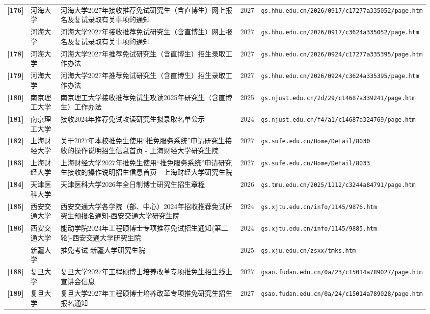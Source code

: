 {\begin{longtable}{@{}p{1.15cm}p{2.9cm}p{6.3cm}p{0.85cm}p{5.0cm}@{}}
\textbf{[176]} & 河海大学 & 河海大学2027年接收推荐免试研究生（含直博生）网上报名及复试录取有关事项的通知 & 2027 & \texttt{gs.hhu.edu.cn/2026/0917/c17277a335052/page.htm} \\
[177] & 河海大学 & 河海大学2027年接收推荐免试研究生（含直博生）网上报名及复试录取有关事项的通知 & 2027 & \texttt{gs.hhu.edu.cn/2026/0917/c3624a335052/page.htm} \\
\textbf{[178]} & 河海大学 & 河海大学2027年推荐免试研究生（含直博生）招生录取工作办法 & 2027 & \texttt{gs.hhu.edu.cn/2026/0924/c17277a335395/page.htm} \\
\textbf{[179]} & 河海大学 & 河海大学2027年推荐免试研究生（含直博生）招生录取工作办法 & 2027 & \texttt{gs.hhu.edu.cn/2026/0924/c3624a335395/page.htm} \\
\textbf{[180]} & 南京理工大学 & 南京理工大学接收推荐免试生攻读2025年研究生（含直博生）工作办法 & 2025 & \texttt{gs.njust.edu.cn/2d/29/c14687a339241/page.htm} \\
\textbf{[181]} & 南京理工大学 & 接收2024年推荐免试攻读研究生拟录取名单公示 & 2024 & \texttt{gs.njust.edu.cn/f4/a1/c14687a324769/page.htm} \\
\textbf{[182]} & 上海财经大学 & 关于2027年本校推免生使用“推免服务系统”申请研究生接收的操作说明\textbar{}招生信息\textbar{}首页 - 上海财经大学研究生院 & 2027 & \texttt{gs.sufe.edu.cn/Home/Detail/8030} \\
\textbf{[183]} & 上海财经大学 & 上海财经大学2027年推免生使用“推免服务系统”申请研究生接收的操作说明\textbar{}招生信息\textbar{}首页 - 上海财经大学研究生院 & 2027 & \texttt{gs.sufe.edu.cn/Home/Detail/8033} \\
\textbf{[184]} & 天津医科大学 & 天津医科大学2026年全日制博士研究生招生章程 & 2026 & \texttt{gs.tmu.edu.cn/2025/1112/c3244a84791/page.htm} \\
\textbf{[185]} & 西安交通大学 & 西安交通大学各学院（部、中心）2024年招收推荐免试研究生预报名通知-西安交通大学研究生院 & 2024 & \texttt{gs.xjtu.edu.cn/info/1145/9876.htm} \\
\textbf{[186]} & 西安交通大学 & 能动学院2024年工程硕博士专项推荐免试招生通知(第二轮)-西安交通大学研究生院 & 2024 & \texttt{gs.xjtu.edu.cn/info/1145/9885.htm} \\
[187] & 新疆大学 & 推免考试-新疆大学研究生院 & 2025 & \texttt{gs.xju.edu.cn/zsxx/tmks.htm} \\
\textbf{[188]} & 复旦大学 & 复旦大学2027年工程硕博士培养改革专项推免生招生线上宣讲会信息 & 2027 & \texttt{gsao.fudan.edu.cn/0a/23/c15014a789027/page.htm} \\
\textbf{[189]} & 复旦大学 & 复旦大学2027年工程硕博士培养改革专项推免研究生招生报名通知 & 2027 & \texttt{gsao.fudan.edu.cn/0a/24/c15014a789028/page.htm} \\

\end{longtable}}
